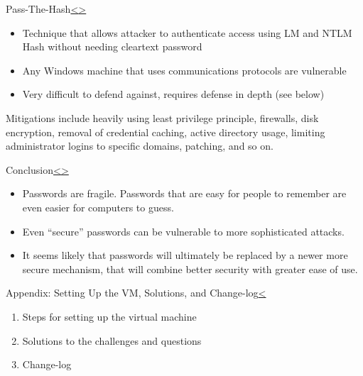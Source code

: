 \documentclass[12pt]{article}
\newenvironment{instructionblock}{\Large\bgroup}{\egroup}
\newcommand{\bi}{\begin{itemize}}
\newcommand{\ei}{\end{itemize}}
\begin{document}
\pagebreak
\begin{slide}{Pass-The-Hash\cite{passthehash}}{\hyperref[slide 24]{\textless}\hyperref[slide 26]{\textgreater}}
	\begin{instructionblock}
			\bi
				\item Technique that allows attacker to authenticate access using LM and NTLM Hash without needing cleartext password
				\item Any Windows machine that uses communications protocols are vulnerable
				\item Very difficult to defend against, requires defense in depth (see below)
			\ei
	\end{instructionblock}
\end{slide}
Mitigations include heavily using least privilege principle, firewalls, disk encryption, removal of credential caching, active directory usage, limiting administrator logins to specific domains, patching, and so on.
\pagebreak
\begin{slide}{Conclusion}{\hyperref[slide 25]{\textless}\hyperref[slide 27]{\textgreater}}
\begin{instructionblock}
\begin{itemize}
\item Passwords are fragile.  Passwords that are easy for people to remember are even easier for computers to guess.
\item Even ``secure'' passwords can be vulnerable to more sophisticated attacks.
\item It seems likely that passwords will ultimately be replaced by a newer more secure mechanism,  that will combine better security with greater ease of use.
\end{itemize}
\end{instructionblock}
\end{slide}
\vfill

\pagebreak

\begin{slide}{Appendix: Setting Up the VM, Solutions, and Change-log}{\hyperref[slide 26]{\textless}}
	\begin{instructionblock}
		\begin{enumerate}
			\item {Steps for setting up the virtual machine}
			\item {Solutions to the challenges and questions}
				
			\item {Change-log}
		\end{enumerate}
	\end{instructionblock}
\end{slide}
\end{document}
